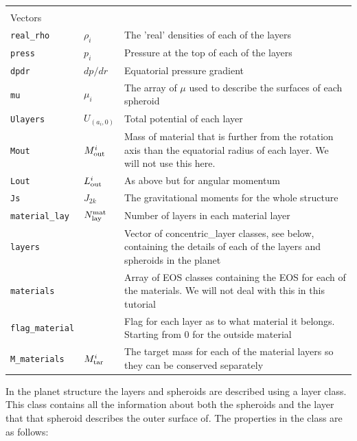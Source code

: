 \documentclass[11pt, oneside]{article}   	%
\begin{document}
\begin{longtable}{l l p{10cm}}
\multicolumn{3}{l}{} \\
\multicolumn{3}{l}{Vectors} \\
\hline
\texttt{real\_rho} & $\rho_i$ & The 'real' densities of each of the layers \\
\texttt{press} & $p_i$ & Pressure at the top of each of the layers \\
\texttt{dpdr} & $dp/dr$ & Equatorial pressure gradient \\
\texttt{mu} & $\mu_i$ & The array of $\mu$ used to describe the surfaces of each spheroid \\
\texttt{Ulayers} & $U_(a_i, 0)$ & Total potential of each layer \\
\texttt{Mout} & $M_{\rm out}^i$ & Mass of material that is further from the rotation axis than the equatorial radius of each layer. We will not use this here. \\
\texttt{Lout} & $L_{\rm out}^i$ & As above but for angular momentum \\
\texttt{Js} & $J_{2k}$ & The gravitational moments for the whole structure \\
\texttt{material\_lay} & $N_{\rm lay}^{\rm mat}$ & Number of layers in each material layer \\
\texttt{layers} & & Vector of concentric\_layer classes, see below, containing the details of each of the layers and spheroids in the planet \\
\texttt{materials} & & Array of EOS classes containing the EOS for each of the materials. We will not deal with this in this tutorial \\
\texttt{flag\_material} & & Flag for each layer as to what material it belongs. Starting from 0 for the outside material \\
\texttt{M\_materials} & $M_{\rm tar}^i$ & The target mass for each of the material layers so they can be conserved separately \\

\end{longtable}
\vspace{0.5 cm}

In the planet structure the layers and spheroids are described using a layer class. This class contains all the information about both the spheroids and the layer that that spheroid describes the outer surface of. The properties in the class are as follows:
\end{document}
